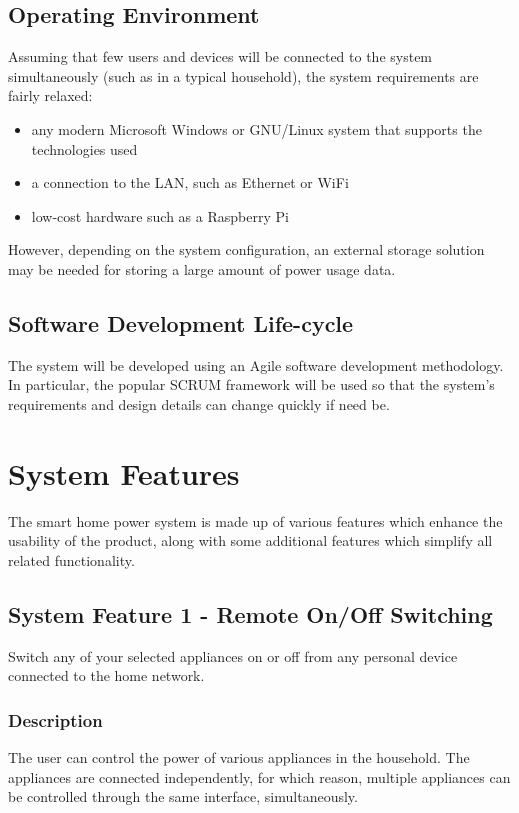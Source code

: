 \documentclass[11pt, a4paper]{article}
\begin{document}
	\subsection{Operating Environment}
	Assuming that few users and devices will be connected to the system simultaneously (such as in a typical household), the system requirements are fairly relaxed:
	\begin{itemize}
		\item any modern Microsoft Windows or GNU/Linux system that supports the technologies used
		\item a connection to the LAN, such as Ethernet or WiFi
		\item low-cost hardware such as a Raspberry Pi
	\end{itemize}
	However, depending on the system configuration, an external storage solution may be needed for storing a large amount of power usage data.
	
	
	\subsection{Software Development Life-cycle}
	The system will be developed using an Agile software development methodology. In particular, the popular SCRUM framework will be used so that the system's requirements and design details can change quickly if need be. 
	
	
	\section{System Features}
	The smart home power system is made up of various features which enhance the usability of the product, along with some additional features which simplify all related functionality.
	\subsection{System Feature 1 - Remote On/Off Switching} 
	Switch any of your selected appliances on or off from any personal device connected to the home network. 
	\subsubsection{Description}
	The user can control the power of various appliances in the household. The appliances are connected independently, for which reason, multiple appliances can be controlled through the same interface, simultaneously. 
\end{document}
